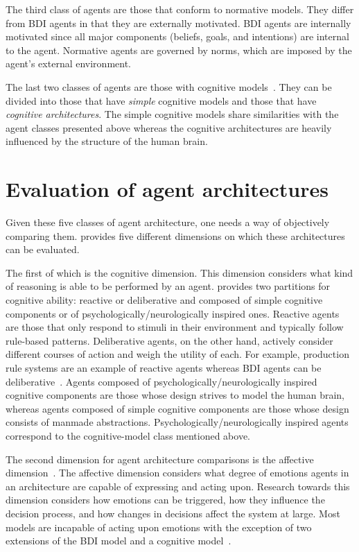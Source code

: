The third class of agents are those that conform to normative models.
They differ from BDI agents in that they are externally motivated.
BDI agents are internally motivated since all major components (beliefs, goals, and intentions) are internal to the agent.
Normative agents are governed by norms, which are imposed by the agent's external environment.

The last two classes of agents are those with cognitive models~\cite{balke_how_2014}.
They can be divided into those that have \textit{simple} cognitive models and those that have \textit{cognitive architectures}.
The simple cognitive models share similarities with the agent classes presented above
whereas the cognitive architectures are heavily influenced by the structure of the human brain.

\section{Evaluation of agent architectures}
\label{sec:agent_evaluation}

Given these five classes of agent architecture, one needs a way of objectively comparing them.
\cite{balke_how_2014} provides five different dimensions on which these architectures can be evaluated.

The first of which is the cognitive dimension.
This dimension considers what kind of reasoning is able to be performed by an agent.
\cite{balke_how_2014} provides two partitions for cognitive ability:
reactive or deliberative and composed of simple cognitive components or of psychologically/neurologically inspired ones.
Reactive agents are those that only respond to stimuli in their environment and typically follow rule-based patterns.
Deliberative agents, on the other hand, actively consider different courses of action and weigh the utility of each.
For example, production rule systems are an example of reactive agents whereas BDI agents can be deliberative~\cite{balke_how_2014}.
Agents composed of psychologically/neurologically inspired cognitive components are those whose design strives to model the human brain,
whereas agents composed of simple cognitive components are those whose design consists of manmade abstractions.
Psychologically/neurologically inspired agents correspond to the cognitive-model class mentioned above.

The second dimension for agent architecture comparisons is the affective dimension~\cite{balke_how_2014}.
The affective dimension considers what degree of emotions agents in an architecture are capable of expressing and acting upon.
Research towards this dimension considers how emotions can be triggered, how they influence the decision process, and how changes in decisions affect the system at large.
Most models are incapable of acting upon emotions \cite{balke_how_2014} with the exception of two extensions of the BDI model \cite{jiang_ebdi_2007, dignum_towards_2009} and a cognitive model~\cite{urban_pecs_2000}.

